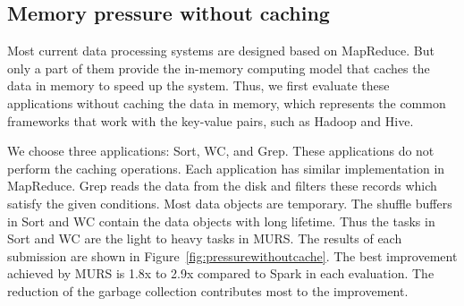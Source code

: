 \subsection{Memory pressure without caching}

Most current data processing systems are designed based on MapReduce. But only a part of them provide the in-memory computing model that caches the data in memory to speed up the system. Thus, we first evaluate these applications without caching the data in memory, which represents the common frameworks that work with the key-value pairs, such as Hadoop and Hive.

We choose three applications: Sort, WC, and Grep. These applications do not perform the caching operations. Each application has similar implementation in MapReduce. Grep reads the data from the disk and filters these records which satisfy the given conditions. Most data objects are temporary. The shuffle buffers in Sort and WC contain the data objects with long lifetime. Thus the tasks in Sort and WC are the light to heavy tasks in MURS. The results of each submission are shown in Figure~\ref{fig:pressurewithoutcache}. The best improvement achieved by MURS is 1.8x to 2.9x compared to Spark in each evaluation. The reduction of the garbage collection contributes most to the improvement.

\begin{figure*}[!t]
\centering
{}
\caption{Results of memory pressure without caching}
\label{fig:pressurewithoutcache}
\end{figure*}

